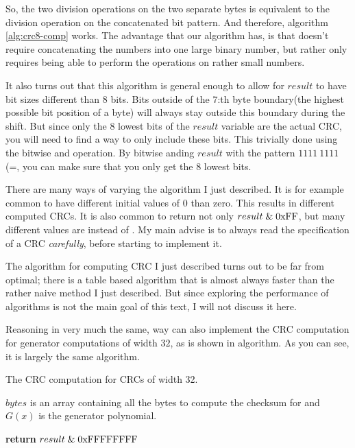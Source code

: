 So, the two division operations on the two separate bytes is
equivalent to the division operation on the concatenated bit
pattern. And therefore, algorithm \ref{alg:crc8-comp} works. The
advantage that our algorithm has, is that doesn't require
concatenating the numbers into one large binary number, but rather
only requires being able to perform the operations on rather small
numbers.

It also turns out that this algorithm is general enough to allow for
$result$ to have bit sizes different than 8 bits. Bits outside of the
$7$:th byte boundary(the highest possible bit position of a byte) will
always stay outside this boundary during the shift. But since only the
8 lowest bits of the $result$ variable are the actual CRC, you will
need to find a way to only include these bits. This trivially done
using the bitwise and operation. By bitwise anding $result$ with the
pattern $1111\ 1111$(=, you can make sure that you only get
the 8 lowest bits.

There are many ways of varying the algorithm I just described. It is
for example common to have different initial values of $0$ than
zero. This results in different computed CRCs. It is also common to
return not only $result \mathrel{\&} \mathrm{0xFF}$, but many different values
are instead of . My main advise is to always read the
specification of a CRC \textit{carefully}, before starting to
implement it.

The algorithm for computing CRC I just described turns out to be far
from optimal; there is a table based algorithm that is almost always
faster than the rather naive method I just described. But since
exploring the performance of algorithms is not the main goal of this
text, I will not discuss it here.

Reasoning in very much the same, way can also implement the CRC
computation for generator computations of width $32$, as is shown in
algorithm. As you can see, it is largely the same algorithm.


\begin{algorithm}[H]
  \caption{The CRC computation for CRCs of width 32.}
  \label{alg:crc8-comp}
  \begin{algorithmic}[1]
    \Require $bytes$ is an array containing all the bytes to compute
    the checksum for and $G(x)$ is the generator polynomial.



    \Else
    \EndIf
    \EndRepeatn

    \EndForEach

    \State \textbf{return}  $result \mathrel{\&} \mathrm{0xFFFFFFFF}$
    \EndProcedure

  \end{algorithmic}
\end{algorithm}

